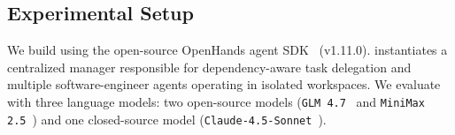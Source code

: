 


\subsection{Experimental Setup}
We build \ourmethod using the open-source OpenHands agent SDK~\citep{wang2024openhands,wang2025openhands} (v1.11.0). \ourmethod instantiates a centralized manager responsible for dependency-aware task delegation and multiple software-engineer agents operating in isolated workspaces. We evaluate \ourmethod with three language models: two open-source models (\texttt{GLM 4.7}~\citep{zeng2025glm} and \texttt{MiniMax 2.5}~\citep{minimax2024minimax25}) and one closed-source model (\texttt{Claude-4.5-Sonnet}~\citep{anthropic2024claude45}).

